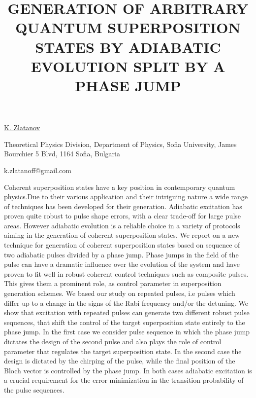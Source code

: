 \title{GENERATION OF ARBITRARY QUANTUM SUPERPOSITION STATES BY ADIABATIC EVOLUTION SPLIT BY A PHASE JUMP}

\underline{K. Zlatanov}  

{\normalsize{\vspace{-4mm}
Theoretical Physics Division,
Department of Physics, Sofia University,
James Bourchier 5 Blvd, 1164 Sofia, Bulgaria



\email k.zlatanoff@gmail.com}}

Coherent superposition states have a key position in contemporary quantum physics.Due to their various 
application and their intriguing nature a wide range of techniques has been developed for their generation.
Adiabatic excitation has proven quite robust to pulse shape errors, 
with a clear trade-off for large pulse areas. However adiabatic evolution is a reliable choice in a 
variety of protocols aiming in the generation of coherent superposition states.  
We report on a new technique for generation of coherent superposition states based on sequence of two
adiabatic pulses divided by a phase jump. Phase jumps in the field of the pulse can have a dramatic
influence over the evolution of the system and have proven to fit well in robust coherent control techniques such
as composite pulses. This gives them a prominent role,
as control parameter in superposition generation schemes. We based our study on repeated pulses, i.e pulses which differ up
to a change in the signs of the Rabi frequency and/or the detuning. We show that excitation with repeated
pulses can generate two different robust pulse sequences, that shift the control of the target superposition state
entirely to the phase jump. In the first case we consider pulse sequence in which the phase jump dictates the
design of the second pulse and also plays the role of control parameter that regulates the target superposition
state. In the second case the design is dictated by the chirping of the pulse, while the final position of the Bloch
vector is controlled by the phase jump. In both cases adiabatic excitation is a crucial requirement for the error
minimization in the transition probability of the pulse sequences.

\vspace{\baselineskip}